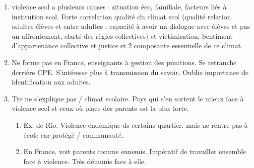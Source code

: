 \documentclass[12pt]{article}
\begin{document}
\begin{itemize}
{\begin{minipage}{19cm}
\begin{enumerate}
\item violence scol a plusieurs causes : situation éco, familiale, facteurs liés à institution scol. Forte correlation qualité du climat scol (qualité relation adultes-élèves et entre adultes : capacité à avoir un dialogue avec élèves et pas un affrontement, clarté des règles collectives) et victimisation. Sentiment d'appartenance collective et justice st 2 composante essentielle de ce climat.\\
\item Ne forme pas en France, enseignants à gestion des punitions. Se retranche derrière CPE. S'intéresse plus à transmission du savoir. Oublie importance de identification aux adultes.\\
\item  Tte ne s'explique pas / climat scolaire. Pays qui s'en sortent le mieux face à violence scol st ceux où place des parents est la plus forte.
\begin{enumerate}
\item Ex: de Rio. Violence endémique ds certains quartier, mais ne rentre pas à école car protégé / communauté. 
\item En France, voit parents comme ennemis. Impératif de travailler ensemble face à violence. Très démunis face à elle.
\end{enumerate}
\end{enumerate}

\end{minipage}
}


\end{itemize}
\end{document}
